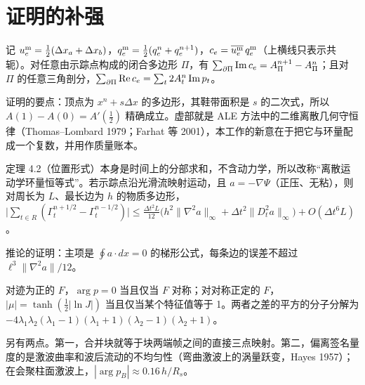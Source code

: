 \section{证明的补强}
\begin{theorem}
记 $u^{\rm m}_e=\frac12(\Delta x_a+\Delta x_b)$，$q^{\rm m}_e=\frac12(q^n_e+q^{n+1}_e)$，$c_e=\overline{u^{\rm m}_e}\,q^{\rm m}_e$（上横线只表示共轭）。对任意由示踪点构成的闭合多边形 $\Pi$，有 $\sum_{\partial\Pi}\operatorname{Im} c_e=A^{n+1}_\Pi-A^n_\Pi$；且对 $\Pi$ 的任意三角剖分，$\sum_{\partial\Pi}\operatorname{Re} c_e=\sum_t2A^n_t\operatorname{Im} p_t$。
\end{theorem}
证明的要点：顶点为 $x^n+s\Delta x$ 的多边形，其鞋带面积是 $s$ 的二次式，所以 $A(1)-A(0)=A'(\tfrac12)$ 精确成立。虚部就是 ALE 方法中的二维离散几何守恒律（Thomas–Lombard 1979；Farhat 等 2001），本工作的新意在于把它与环量配成一个复数，并用作质量账本。

\begin{corollary}[离散 Kelvin 定理]
定理 4.2（位置形式）本身是时间上的分部求和，不含动力学，所以改称“离散运动学环量恒等式”。若示踪点沿光滑流映射运动，且 $a=-\nabla\Psi$（正压、无粘），则对周长为 $L$、最长边为 $h$ 的物质多边形，
$\big|\sum_{t\in R}(\Gamma^{n+1/2}_t-\Gamma^{n-1/2}_t)\big|\le\frac{\Delta t^2L}{12}\big(h^2\|\nabla^2a\|_\infty+\Delta t^2\|D_t^2a\|_\infty\big)+O(\Delta t^6L)$。
\end{corollary}
推论的证明：主项是 $\oint a\cdot dx=0$ 的梯形公式，每条边的误差不超过 $\ell^3\|\nabla^2a\|/12$。

\begin{proposition}[单轴签名是充要条件]
对迹为正的 $F$，$\arg p=0$ 当且仅当 $F$ 对称；对对称正定的 $F$，$|\mu|=\tanh(\frac12|\ln J|)$ 当且仅当某个特征值等于 1。两者之差的平方的分子分解为 $-4\lambda_1\lambda_2(\lambda_1-1)(\lambda_1+1)(\lambda_2-1)(\lambda_2+1)$。
\end{proposition}
另有两点。第一，合并块就等于块两端帧之间的直接三点映射。第二，偏离签名量度的是激波曲率和波后流动的不均匀性（弯曲激波上的涡量跃变，Hayes 1957）；在会聚柱面激波上，$|\arg p_B|\approx0.16\,h/R_s$。

